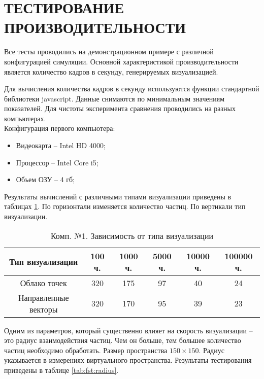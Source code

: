 \newpage
\section{ТЕСТИРОВАНИЕ ПРОИЗВОДИТЕЛЬНОСТИ}

Все тесты проводились на демонстрационном примере с различной конфигурацией
симуляции. Основной характеристикой производительности является количество 
кадров в секунду, генерируемых визуализацией.

Для вычисления количества кадров в секунду используются функции стандартной 
библиотеки javascript. Данные снимаются по минимальным значениям показателей.
Для чистоты эксперимента сравнения проводились на разных компьютерах. \\

Конфигурация первого компьютера:

\begin{itemize}
  \item Видеокарта -- Intel HD 4000;
  \item Процессор -- Intel Core i5;
  \item Объем ОЗУ -- 4 гб;
\end{itemize}

Результаты вычислений с различными типами визуализации приведены 
в таблицах \ref{tab:fst:simple}. По горизонтали изменяется количество частиц.
По вертикали тип визуализации.

\begin{table}[H]
  \caption{\label{tab:fst:simple}Комп. №1. Зависимость от типа визуализации}
  \begin{center}
    \begin{tabular}{|c|c|c|c|c|c|}
      \hline
      Тип визуализации & 100 ч. & 1000 ч. & 5000 ч. & 10000 ч. & 100000 ч. \\
      \hline
      Облако точек & 320 & 175 & 97 & 40 & 24 \\
      Направленные векторы & 320 & 170 & 95 & 39 & 23 \\
      \hline
    \end{tabular}
  \end{center}
\end{table}

Одним из параметров, который существенно влияет на скорость визуализации -- это
радиус взаимодействия частиц. Чем он больше, тем большее количество частиц необходимо
обработать. Размер пространства $150\times150$. Радиус указывается в измерениях
виртуального пространства. Результаты тестирования приведены в таблице \ref{tab:fst:radius}.

